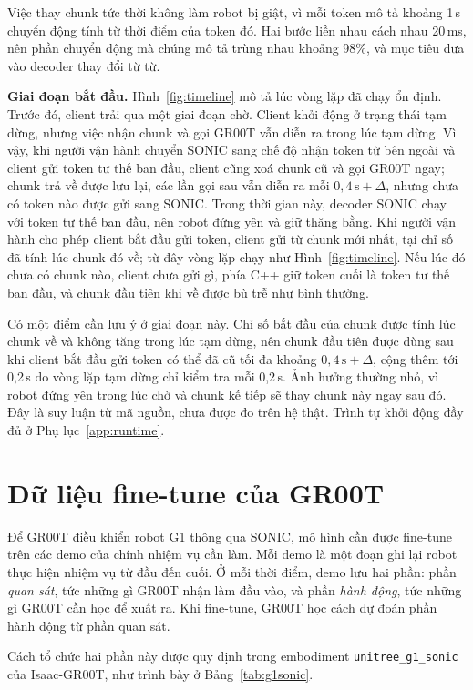 \documentclass[12pt,a4paper,oneside]{report}
\newcommand{\code}[1]{\texttt{#1}}
\begin{document}
Việc thay chunk tức thời không làm robot bị giật, vì mỗi token mô tả khoảng 1\,s chuyển động tính từ thời điểm của token đó. Hai bước liền nhau cách nhau 20\,ms, nên phần chuyển động mà chúng mô tả trùng nhau khoảng 98\%, và mục tiêu đưa vào decoder thay đổi từ từ.

\textbf{Giai đoạn bắt đầu.} Hình~\ref{fig:timeline} mô tả lúc vòng lặp đã chạy ổn định. Trước đó, client trải qua một giai đoạn chờ. Client khởi động ở trạng thái tạm dừng, nhưng việc nhận chunk và gọi GR00T vẫn diễn ra trong lúc tạm dừng. Vì vậy, khi người vận hành chuyển SONIC sang chế độ nhận token từ bên ngoài và client gửi token tư thế ban đầu, client cũng xoá chunk cũ và gọi GR00T ngay; chunk trả về được lưu lại, các lần gọi sau vẫn diễn ra mỗi $0{,}4\,\text{s} + \Delta$, nhưng chưa có token nào được gửi sang SONIC. Trong thời gian này, decoder SONIC chạy với token tư thế ban đầu, nên robot đứng yên và giữ thăng bằng. Khi người vận hành cho phép client bắt đầu gửi token, client gửi từ chunk mới nhất, tại chỉ số đã tính lúc chunk đó về; từ đây vòng lặp chạy như Hình~\ref{fig:timeline}. Nếu lúc đó chưa có chunk nào, client chưa gửi gì, phía C++ giữ token cuối là token tư thế ban đầu, và chunk đầu tiên khi về được bù trễ như bình thường.

Có một điểm cần lưu ý ở giai đoạn này. Chỉ số bắt đầu của chunk được tính lúc chunk về và không tăng trong lúc tạm dừng, nên chunk đầu tiên được dùng sau khi client bắt đầu gửi token có thể đã cũ tối đa khoảng $0{,}4\,\text{s} + \Delta$, cộng thêm tới 0,2\,s do vòng lặp tạm dừng chỉ kiểm tra mỗi 0,2\,s. Ảnh hưởng thường nhỏ, vì robot đứng yên trong lúc chờ và chunk kế tiếp sẽ thay chunk này ngay sau đó. Đây là suy luận từ mã nguồn, chưa được đo trên hệ thật. Trình tự khởi động đầy đủ ở Phụ lục~\ref{app:runtime}.

\section{Dữ liệu fine-tune của GR00T}
\label{sec:gr00t_data}

Để GR00T điều khiển robot G1 thông qua SONIC, mô hình cần được fine-tune trên các demo của chính nhiệm vụ cần làm. Mỗi demo là một đoạn ghi lại robot thực hiện nhiệm vụ từ đầu đến cuối. Ở mỗi thời điểm, demo lưu hai phần: phần \emph{quan sát}, tức những gì GR00T nhận làm đầu vào, và phần \emph{hành động}, tức những gì GR00T cần học để xuất ra. Khi fine-tune, GR00T học cách dự đoán phần hành động từ phần quan sát.

Cách tổ chức hai phần này được quy định trong embodiment \code{unitree\_g1\_sonic} của Isaac-GR00T, như trình bày ở Bảng~\ref{tab:g1sonic}.
\end{document}

